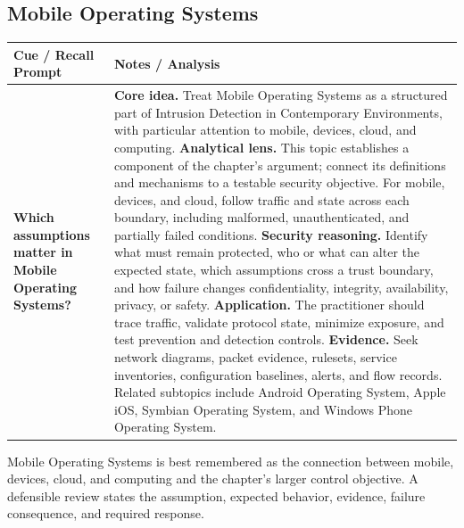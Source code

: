 \documentclass[11pt]{article}
\newcommand{\CornellHeader}{%
\rowcolor{Navy}\color{white}\bfseries Cue / Recall Prompt & \color{white}\bfseries Notes / Analysis\\\hline}
\newcommand{\CornellRow}[2]{%
\cellcolor{CueGray}\RaggedRight\textbf{#1} & \RaggedRight #2\\\hline}
\begin{document}
\subsection*{Mobile Operating Systems}
\begin{longtable}{>{\RaggedRight\arraybackslash}p{}|>{\RaggedRight\arraybackslash}p{}}
\CornellHeader
\CornellRow{Which assumptions matter in Mobile Operating Systems?}{\textbf{Core idea.} Treat Mobile Operating Systems as a structured part of Intrusion Detection in Contemporary Environments, with particular attention to mobile, devices, cloud, and computing. \textbf{Analytical lens.} This topic establishes a component of the chapter's argument; connect its definitions and mechanisms to a testable security objective. For mobile, devices, and cloud, follow traffic and state across each boundary, including malformed, unauthenticated, and partially failed conditions. \textbf{Security reasoning.} Identify what must remain protected, who or what can alter the expected state, which assumptions cross a trust boundary, and how failure changes confidentiality, integrity, availability, privacy, or safety. \textbf{Application.} The practitioner should trace traffic, validate protocol state, minimize exposure, and test prevention and detection controls. \textbf{Evidence.} Seek network diagrams, packet evidence, rulesets, service inventories, configuration baselines, alerts, and flow records. Related subtopics include Android Operating System, Apple iOS, Symbian Operating System, and Windows Phone Operating System.}
\end{longtable}
\begin{topicsummary}
Mobile Operating Systems is best remembered as the connection between mobile, devices, cloud, and computing and the chapter's larger control objective. A defensible review states the assumption, expected behavior, evidence, failure consequence, and required response.
\end{topicsummary}
\end{document}
